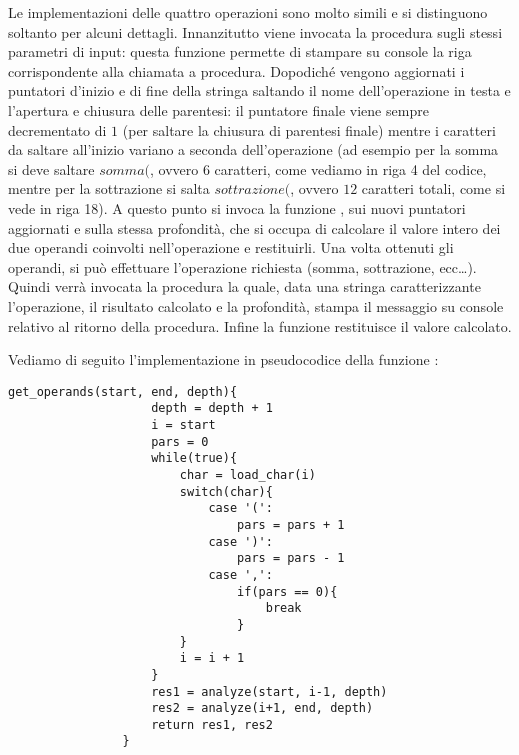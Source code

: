         Le implementazioni delle quattro operazioni sono molto simili e si distinguono soltanto per alcuni dettagli. Innanzitutto viene invocata la procedura  sugli stessi parametri di input: questa funzione permette di stampare su console la riga corrispondente alla chiamata a procedura. Dopodiché vengono aggiornati i puntatori d'inizio e di fine della stringa saltando il nome dell'operazione in testa e l'apertura e chiusura delle parentesi: il puntatore finale viene sempre decrementato di $1$ (per saltare la chiusura di parentesi finale) mentre i caratteri da saltare all'inizio variano a seconda dell'operazione (ad esempio per la somma si deve saltare $somma($, ovvero $6$ caratteri, come vediamo in riga 4 del codice, mentre per la sottrazione si salta $sottrazione($, ovvero $12$ caratteri totali, come si vede in riga 18). A questo punto si invoca la funzione , sui nuovi puntatori aggiornati e sulla stessa profondità, che si occupa di calcolare il valore intero dei due operandi coinvolti nell'operazione e restituirli. Una volta ottenuti gli operandi, si può effettuare l'operazione richiesta (somma, sottrazione, ecc\dots). Quindi verrà invocata la procedura  la quale, data una stringa caratterizzante l'operazione, il risultato calcolato e la profondità, stampa il messaggio su console relativo al ritorno della procedura. Infine la funzione restituisce il valore calcolato.
        
        Vediamo di seguito l'implementazione in pseudocodice della funzione :
        
        \begin{center}
           	\begin{lstlisting}[language=pseudo, gobble=14]
                get_operands(start, end, depth){
                    depth = depth + 1
                    i = start
                    pars = 0
                    while(true){
                        char = load_char(i)
                        switch(char){
                            case '(':
                                pars = pars + 1
                            case ')':
                                pars = pars - 1
                            case ',':
                                if(pars == 0){
                                    break
                                }
                        }
                        i = i + 1
                    }
                    res1 = analyze(start, i-1, depth)
                    res2 = analyze(i+1, end, depth)
                    return res1, res2
                }
           	\end{lstlisting}
        \end{center}
        
